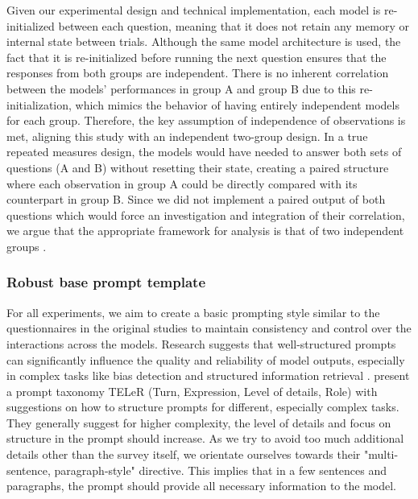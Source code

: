 \par Given our experimental design and technical implementation, each model is re-initialized between each question, meaning that it does not retain any memory or internal state between trials. Although the same model architecture is used, the fact that it is re-initialized before running the next question ensures that the responses from both groups are independent. There is no inherent correlation between the models' performances in group A and group B due to this re-initialization, which mimics the behavior of having entirely independent models for each group. Therefore, the key assumption of independence of observations is met, aligning this study with an independent two-group design. In a true repeated measures design, the models would have needed to answer both sets of questions (A and B) without resetting their state, creating a paired structure where each observation in group A could be directly compared with its counterpart in group B. Since we did not implement a paired output of both questions which would force an investigation and integration of their correlation, we argue that the appropriate framework for analysis is that of two independent groups \parencite{dunlap1996meta}.

\newpage
\subsubsection{Robust base prompt template}
\par For all experiments, we aim to create a basic prompting style similar to the questionnaires in the original studies to maintain consistency and control over the interactions across the models. Research suggests that well-structured prompts can significantly influence the quality and reliability of model outputs, especially in complex tasks like bias detection and structured information retrieval \parencite{chen2023unleashing,santu2023teler}. \textcite{santu2023teler} present a prompt taxonomy TELeR (Turn, Expression, Level of details, Role) with suggestions on how to structure prompts for different, especially complex tasks. They generally suggest for higher complexity, the level of details and focus on structure in the prompt should increase. As we try to avoid too much additional details other than the survey itself, we orientate ourselves towards their "multi-sentence, paragraph-style" directive. This implies that in a few sentences and paragraphs, the prompt should provide all necessary information to the model.

